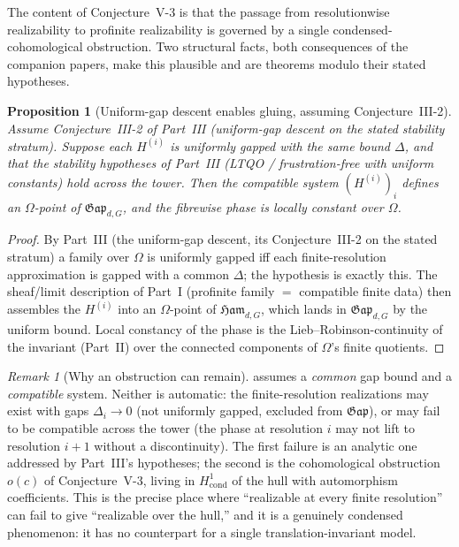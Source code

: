 \documentclass[12pt]{article}
\newcommand{\Ham}{\mathfrak{Ham}}              %
\newcommand{\Gap}{\mathfrak{Gap}}              %
\newcommand{\gapbound}{\Delta}                  %
\newcommand{\dis}{\Omega}                       %
\newtheorem{proposition}[theorem]{Proposition}
\theoremstyle{definition}
\theoremstyle{remark}
\newtheorem{remark}[theorem]{Remark}
\begin{document}
The content of Conjecture~V-3 is that the passage from resolutionwise realizability to
profinite realizability is governed by a single condensed-cohomological obstruction. Two
structural facts, both consequences of the companion papers, make this plausible and are
theorems modulo their stated hypotheses.

\begin{proposition}[Uniform-gap descent enables gluing, assuming Conjecture~III-2]
\label{prop:descent}
Assume Conjecture~III-2 of Part~III (uniform-gap descent on the stated stability stratum).
Suppose each $H^{(i)}$ is uniformly gapped with the \emph{same} bound $\gapbound$, and that
the stability hypotheses of Part~III (LTQO / frustration-free with uniform constants) hold
across the tower. Then the compatible system $(H^{(i)})_i$ defines an $\dis$-point of
$\Gap_{d,G}$, and the fibrewise phase is locally constant over $\dis$.
\end{proposition}

\begin{proof}
By Part~III (the uniform-gap descent, its Conjecture~III-2 on the stated stratum) a family
over $\dis$ is uniformly gapped iff each finite-resolution approximation is gapped with a
common $\gapbound$; the hypothesis is exactly this. The sheaf/limit description of Part~I
(profinite family $=$ compatible finite data) then assembles the $H^{(i)}$ into an
$\dis$-point of $\Ham_{d,G}$, which lands in $\Gap_{d,G}$ by the uniform bound. Local
constancy of the phase is the Lieb--Robinson-continuity of the invariant (Part~II) over the
connected components of $\dis$'s finite quotients.
\end{proof}

\begin{remark}[Why an obstruction can remain]
 assumes a \emph{common} gap bound and a \emph{compatible} system. Neither
is automatic: the finite-resolution realizations may exist with gaps $\gapbound_i\to0$ (not
uniformly gapped, excluded from $\Gap$), or may fail to be compatible across the tower
(the phase at resolution $i$ may not lift to resolution $i+1$ without a discontinuity). The
first failure is an analytic one addressed by Part~III's hypotheses; the second is the
cohomological obstruction $o(c)$ of Conjecture~V-3, living in $H^1_{\mathrm{cond}}$ of the
hull with automorphism coefficients. This is the precise place where ``realizable at every
finite resolution'' can fail to give ``realizable over the hull,'' and it is a genuinely
condensed phenomenon: it has no counterpart for a single translation-invariant model.
\end{remark}
\end{document}
